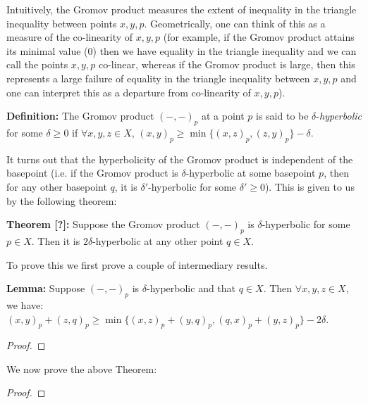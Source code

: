 \documentclass[12pt]{article}
\newcommand{\vs}{\vskip10pt}
\begin{document}
	\vs 
	
	Intuitively, the Gromov product measures the extent of inequality in the triangle inequality between points $x,y,p$. Geometrically, one can think of this as a measure of the co-linearity of $x,y,p$ (for example, if the Gromov product attains its minimal value (0) then we have equality in the triangle inequality and we can call the points $x,y,p$ co-linear, whereas if the Gromov product is large, then this represents a large failure of equality in the triangle inequality between $x,y,p$ and one can interpret this as a departure from co-linearity of $x,y,p$). 
	
	\vs 
	
	\textbf{Definition: } The Gromov product $(-,-)_p$ at a point $p$ is said to be $\delta$-\textit{hyperbolic} for some $\delta \geq 0$ if $\forall x,y,z \in X$, $(x,y)_p \geq \min \{(x,z)_p, (z,y)_p\} - \delta$. 
	
	\vs 
	
	It turns out that the hyperbolicity of the Gromov product is independent of the basepoint (i.e. if the Gromov product is $\delta$-hyperbolic at some basepoint $p$, then for any other basepoint $q$, it is $\delta'$-hyperbolic for some $\delta' \geq 0$). This is given to us by the following theorem: 
	
	\vs 
	
	\textbf{Theorem [?]: } Suppose the Gromov product $(-,-)_p$ is $\delta$-hyperbolic for some $p \in X$. Then it is $2\delta$-hyperbolic at any other point $q \in X$. 
	
	\vs 
	
	To prove this we first prove a couple of intermediary results. 
	
	\vs
	
	\textbf{Lemma: } Suppose $(-,-)_p$ is $\delta$-hyperbolic and that $q \in X$. Then $\forall x,y,z \in X$, we have: $(x,y)_p + (z,q)_p \geq \min \{(x,z)_p + (y,q)_p, (q,x)_p + (y,z)_p\} - 2\delta$. 
	
	\begin{proof}
		
		
		
	\end{proof}

	We now prove the above Theorem:
	
	\begin{proof}
		
		
		
	\end{proof}
\end{document}
